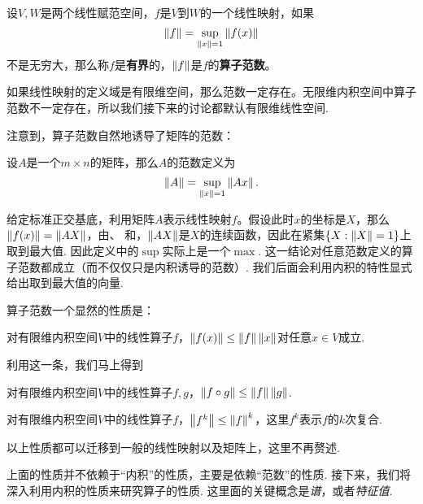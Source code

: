 \begin{definition}[线性映射的范数]
    设$V,W$是两个线性赋范空间，$f$是$V$到$W$的一个线性映射，如果
    \[\left\|f\right\|=\sup_{\left\|x\right\|=1}\left\|f(x)\right\|\]
    不是无穷大，那么称$f$是\textbf{有界}的，$\left\|f\right\|$是$f$的\textbf{算子范数}。
\end{definition}

如果线性映射的定义域是有限维空间，那么范数一定存在。无限维内积空间中算子范数不一定存在，所以我们接下来的讨论都默认有限维线性空间. 

注意到，算子范数自然地诱导了矩阵的范数：
\begin{definition}[矩阵范数]
    设$A$是一个$m\times n$的矩阵，那么$A$的范数定义为
    \[\left\|A\right\|=\sup_{\left\|x\right\|=1}\left\|Ax\right\|.\]
\end{definition}

给定标准正交基底，利用矩阵$A$表示线性映射$f$。假设此时$x$的坐标是$X$，那么$\left\|f(x)\right\|=\left\|AX\right\|$，由、 和，$\left\|AX\right\|$是$X$的连续函数，因此在紧集$\{X:\left\|X\right\|=1\}$上取到最大值. 因此定义中的$\sup$实际上是一个$\max$. 这一结论对任意范数定义的算子范数都成立（而不仅仅只是内积诱导的范数）. 我们后面会利用内积的特性显式给出取到最大值的向量. 

算子范数一个显然的性质是：

\begin{proposition}\label{prop:norm-ineq}
对有限维内积空间$V$中的线性算子$f$，$\left\|f(x)\right\|\leq \left\|f\right\|\left\|x\right\|$对任意$x\in V$成立. 
\end{proposition}

利用这一条，我们马上得到

\begin{proposition}\label{prop:operator-norm-ineq}
对有限维内积空间$V$中的线性算子$f,g$，$\left\|f\circ g\right\|\leq \left\|f\right\|\left\|g\right\|$.
\end{proposition}

\begin{proposition}\label{prop:operator-power-norm-ineq}
    对有限维内积空间$V$中的线性算子$f$，$\left\|f^k\right\|\leq \left\|f\right\|^k$，这里$f^k$表示$f$的$k$次复合. 
\end{proposition}

以上性质都可以迁移到一般的线性映射以及矩阵上，这里不再赘述. 

上面的性质并不依赖于“内积”的性质，主要是依赖“范数”的性质. 接下来，我们将深入利用内积的性质来研究算子的性质. 这里面的关键概念是\emph{谱}，或者\emph{特征值}. 

